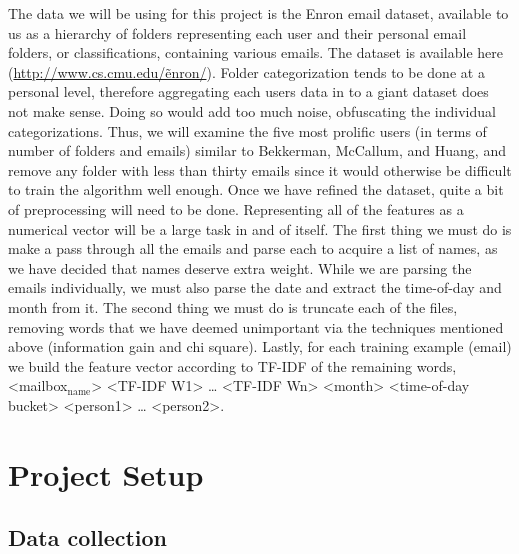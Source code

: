 \documentclass[11pt]{article}
\begin{document}
The data we will be using for this project is the Enron email dataset, available to us as a hierarchy of folders representing each user and their personal email folders, or classifications, containing various emails. The dataset is available here (\href{http://www.cs.cmu.edu/~enron/}{http://www.cs.cmu.edu/\~enron/}). Folder categorization tends to be done at a personal level, therefore aggregating each users data in to a giant dataset does not make sense. Doing so would add too much noise, obfuscating the individual categorizations. Thus, we will examine the five most prolific users (in terms of number of folders and emails) similar to Bekkerman, McCallum, and Huang, and remove any folder with less than thirty emails since it would otherwise be difficult to train the algorithm well enough.
Once we have refined the dataset, quite a bit of preprocessing will need to be done. Representing all of the features as a numerical vector will be a large task in and of itself. The first thing we must do is make a pass through all the emails and parse each to acquire a list of names, as we have decided that names deserve extra weight. While we are parsing the emails individually, we must also parse the date and extract the time-of-day and month from it. The second thing we must do is truncate each of the files, removing words that we have deemed unimportant via the techniques mentioned above (information gain and chi square). Lastly, for each training example (email) we build the feature vector according to TF-IDF of the remaining words, \\<mailbox$_{\mathrm{name}}$> <TF-IDF W1> … <TF-IDF Wn> <month> <time-of-day bucket> <person1> … <person2>.
\section{Project Setup}
\label{sec-4}
\subsection{Data collection}
\label{sec-4-1}
\end{document}
